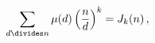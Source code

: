 \[\sum_{d\divides n}\mathop{\mu\/}\nolimits\!\left(d\right)\left(\frac{n}{d}%
\right)^{k}=\mathop{J_{k}\/}\nolimits\!\left(n\right),\]